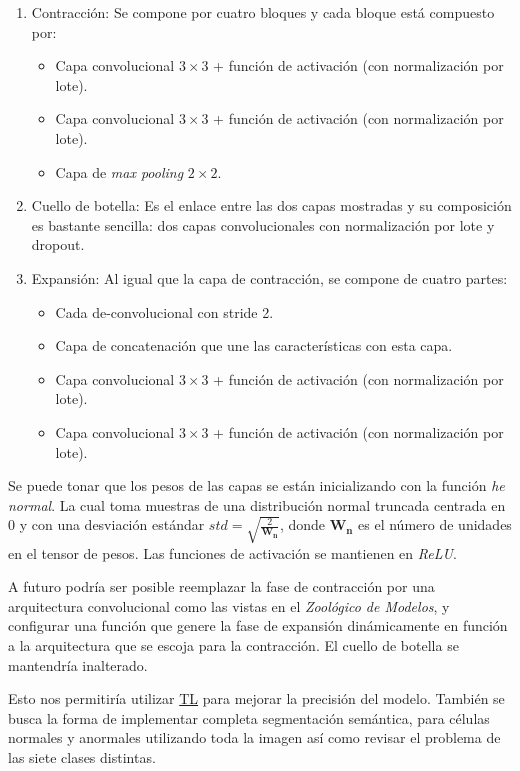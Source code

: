 \begin{enumerate}
    \item{Contracción:} Se compone por cuatro bloques y cada bloque está compuesto por:
        \begin{itemize}
            \item Capa convolucional \(3 \times3 \) + función de activación (con normalización por lote).
            \item Capa convolucional \(3 \times3 \) + función de activación (con normalización por lote).
            \item Capa de \emph{max pooling} \(2 \times2 \).
        \end{itemize}
    \item{Cuello de botella:} Es el enlace entre las dos capas mostradas y su composición es bastante 
    sencilla: dos capas convolucionales con normalización por lote y dropout.
    \item{Expansión:} Al igual que la capa de contracción, se compone de cuatro partes:
    \begin{itemize}
        \item Cada de-convolucional con stride 2.
        \item Capa de concatenación que une las características con esta capa.
        \item  Capa convolucional \(3 \times3 \) + función de activación (con normalización por lote).
        \item  Capa convolucional \(3 \times3 \) + función de activación (con normalización por lote).
    \end{itemize}
\end{enumerate}

Se puede tonar que los pesos de las capas se están inicializando con la función
\emph{he normal}. La cual toma muestras de una distribución normal truncada
centrada en 0 y con una desviación estándar \(std =
\sqrt{\frac{2}{\mathbf{W_{n}}}}\), donde \(\mathbf{W_{n}}\) es el número de
unidades en el tensor de pesos.  Las funciones de activación se mantienen en
\emph{ReLU}.~\cite{He2015} 

A futuro podría ser posible reemplazar la fase de contracción por una arquitectura
convolucional como las vistas en el \emph{Zoológico de Modelos}, y configurar una función
que genere la fase de expansión dinámicamente en función a la arquitectura que se escoja 
para la contracción. El cuello de botella se mantendría inalterado.

Esto nos permitiría utilizar \hyperlink{abbr}{TL} para mejorar la precisión del
modelo. También se busca la forma de implementar completa segmentación
semántica, para células normales y anormales utilizando toda la imagen así como
revisar el problema de las siete clases distintas.

